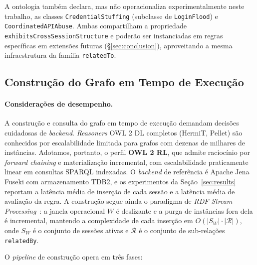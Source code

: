 \documentclass[preprint,12pt]{elsarticle}
\begin{document}
A ontologia também declara, mas não operacionaliza experimentalmente neste trabalho, as classes \texttt{CredentialStuffing} (subclasse de \texttt{LoginFlood}) e \texttt{CoordinatedAPIAbuse}. Ambas compartilham a propriedade \texttt{exhibitsCrossSessionStructure} e poderão ser instanciadas em regras específicas em extensões futuras (§\ref{sec:conclusion}), aproveitando a mesma infraestrutura da família \texttt{relatedTo}.

\subsection{Construção do Grafo em Tempo de Execução}
\label{sec:approach:pipeline}

\paragraph{Considerações de desempenho.} A construção e consulta do grafo em tempo de execução demandam decisões cuidadosas de \emph{backend}. \emph{Reasoners} OWL 2 DL completos (HermiT, Pellet) são conhecidos por escalabilidade limitada para grafos com dezenas de milhares de instâncias. Adotamos, portanto, o perfil \textbf{OWL 2 RL}, que admite raciocínio por \emph{forward chaining} e materialização incremental, com escalabilidade praticamente linear em consultas SPARQL indexadas. O \emph{backend} de referência é Apache Jena Fuseki com armazenamento TDB2, e os experimentos da Seção~\ref{sec:results} reportam a latência média de inserção de cada sessão e a latência média de avaliação da regra. A construção segue ainda o paradigma de \emph{RDF Stream Processing}~\cite{liu2022recent}: a janela operacional $W$ é deslizante e a purga de instâncias fora dela é incremental, mantendo a complexidade de cada inserção em $O(|S_W| \cdot |\mathcal{R}|)$, onde $S_W$ é o conjunto de sessões ativas e $\mathcal{R}$ é o conjunto de sub-relações \texttt{relatedBy}.

O \emph{pipeline} de construção opera em três fases:
\end{document}
